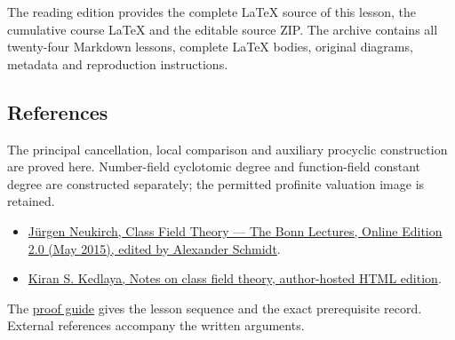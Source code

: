 \documentclass[11pt,a4paper]{article}
\newcommand{\tightlist}{\setlength{\itemsep}{0pt}\setlength{\parskip}{0pt}}
\begin{document}
The reading edition provides the complete LaTeX source of this lesson,
the cumulative course LaTeX and the editable source ZIP. The archive
contains all twenty-four Markdown lessons, complete LaTeX bodies,
original diagrams, metadata and reproduction instructions.

\subsection{References}\label{references}

The principal cancellation, local comparison and auxiliary procyclic
construction are proved here. Number-field cyclotomic degree and
function-field constant degree are constructed separately; the permitted
profinite valuation image is retained.

\begin{itemize}
\tightlist
\item
  \href{https://www.mathi.uni-heidelberg.de/~schmidt/Neukirch-en/Neukirch_cft_02_may15.pdf}{Jürgen
  Neukirch, Class Field Theory --- The Bonn Lectures, Online Edition 2.0
  (May 2015), edited by Alexander Schmidt}.
\item
  \href{https://kskedlaya.org/cft/sec_abstractcft1.html}{Kiran S.
  Kedlaya, Notes on class field theory, author-hosted HTML edition}.
\end{itemize}

The \href{../free-proofs.html}{proof guide} gives the lesson sequence
and the exact prerequisite record. External references accompany the
written arguments.
\end{document}
